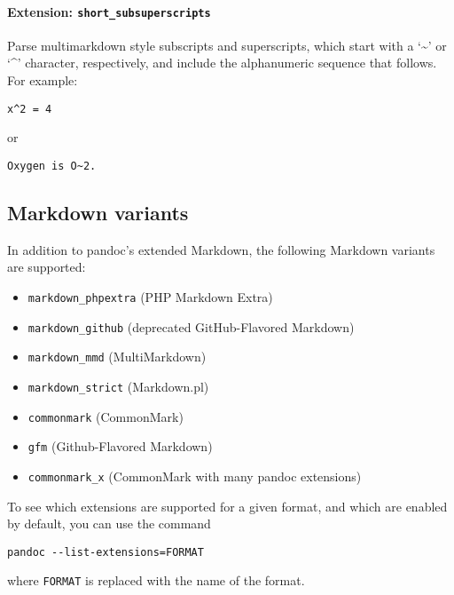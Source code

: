 \documentclass[
]{article}
\providecommand{\tightlist}{%
  \setlength{\itemsep}{0pt}\setlength{\parskip}{0pt}}
\begin{document}
\hypertarget{extension-short_subsuperscripts}{%
\paragraph{\texorpdfstring{Extension:
\texttt{short\_subsuperscripts}}{Extension: short\_subsuperscripts}}\label{extension-short_subsuperscripts}}

Parse multimarkdown style subscripts and superscripts, which start with
a `\textasciitilde{}' or `\^{}' character, respectively, and include the
alphanumeric sequence that follows. For example:

\begin{verbatim}
x^2 = 4
\end{verbatim}

or

\begin{verbatim}
Oxygen is O~2.
\end{verbatim}

\hypertarget{markdown-variants}{%
\subsection{Markdown variants}\label{markdown-variants}}

In addition to pandoc's extended Markdown, the following Markdown
variants are supported:

\begin{itemize}
\tightlist
\item
  \texttt{markdown\_phpextra} (PHP Markdown Extra)
\item
  \texttt{markdown\_github} (deprecated GitHub-Flavored Markdown)
\item
  \texttt{markdown\_mmd} (MultiMarkdown)
\item
  \texttt{markdown\_strict} (Markdown.pl)
\item
  \texttt{commonmark} (CommonMark)
\item
  \texttt{gfm} (Github-Flavored Markdown)
\item
  \texttt{commonmark\_x} (CommonMark with many pandoc extensions)
\end{itemize}

To see which extensions are supported for a given format, and which are
enabled by default, you can use the command

\begin{verbatim}
pandoc --list-extensions=FORMAT
\end{verbatim}

where \texttt{FORMAT} is replaced with the name of the format.
\end{document}
